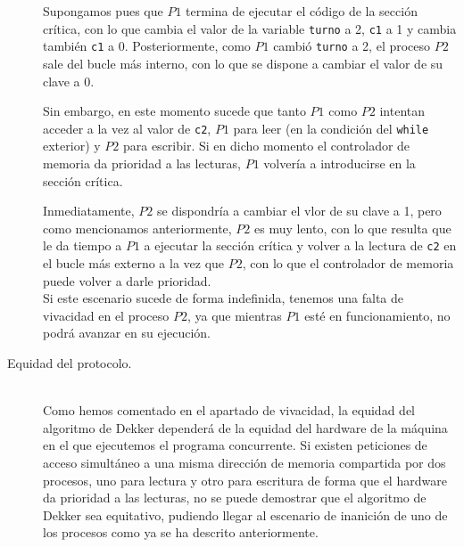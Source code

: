 \begin{description}
    Supongamos pues que $P1$ termina de ejecutar el código de la sección crítica, con lo que cambia el valor de la variable \verb|turno| a 2, \verb|c1| a 1 y cambia también \verb|c1| a 0. Posteriormente, como $P1$ cambió \verb|turno| a 2, el proceso $P2$ sale del bucle más interno, con lo que se dispone a cambiar el valor de su clave a 0.

    Sin embargo, en este momento sucede que tanto $P1$ como $P2$ intentan acceder a la vez al valor de \verb|c2|, $P1$ para leer (en la condición del \verb|while| exterior) y $P2$ para escribir. Si en dicho momento el controlador de memoria da prioridad a las lecturas, $P1$ volvería a introducirse en la sección crítica.

    Inmediatamente, $P2$ se dispondría a cambiar el vlor de su clave a 1, pero como mencionamos anteriormente, $P2$ es muy lento, con lo que resulta que le da tiempo a $P1$ a ejecutar la sección crítica y volver a la lectura de \verb|c2| en el bucle más externo a la vez que $P2$, con lo que el controlador de memoria puede volver a darle prioridad.\\

    Si este escenario sucede de forma indefinida, tenemos una falta de vivacidad en el proceso $P2$, ya que mientras $P1$ esté en funcionamiento, no podrá avanzar en su ejecución.

    \item [Equidad del protocolo.]~\\
    Como hemos comentado en el apartado de vivacidad, la equidad del algoritmo de Dekker dependerá de la equidad del hardware de la máquina en el que ejecutemos el programa concurrente. Si existen peticiones de acceso simultáneo a una misma dirección de memoria compartida por dos procesos, uno para lectura y otro para escritura de forma que el hardware da prioridad a las lecturas, no se puede demostrar que el algoritmo de Dekker sea equitativo, pudiendo llegar al escenario de inanición de uno de los procesos como ya se ha descrito anteriormente.
\end{description}

